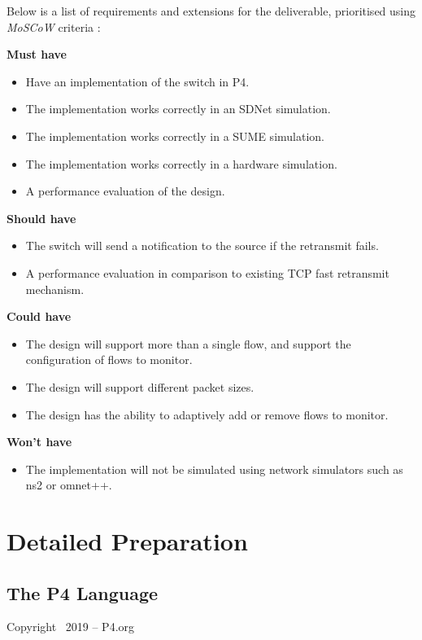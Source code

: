 Below is a list of requirements and extensions for the deliverable, prioritised using \textit{MoSCoW} criteria \cite{moscow}:

\textbf{Must have}
\begin{itemize}
	\item Have an implementation of the switch in P4. 
	\item The implementation works correctly in an SDNet simulation.
	\item The implementation works correctly in a SUME simulation.
	\item The implementation works correctly in a hardware simulation.
	\item A performance evaluation of the design.
\end{itemize}

\textbf{Should have}
\begin{itemize}
	\item The switch will send a notification to the source if the retransmit fails.
	\item A performance evaluation in comparison to existing TCP fast retransmit mechanism.
\end{itemize}

\textbf{Could have}
\begin{itemize}
	\item The design will support more than a single flow, and support the configuration of flows to monitor.
	\item The design will support different packet sizes.
	\item The design has the ability to adaptively add or remove flows to monitor.
\end{itemize}

\textbf{Won't have}
\begin{itemize}
	\item The implementation will not be simulated using network simulators such as ns2 or omnet++.
\end{itemize}

\section{Detailed Preparation}
\subsection{The P4 Language}

Copyright \textcopyright\ 2019 -- P4.org

